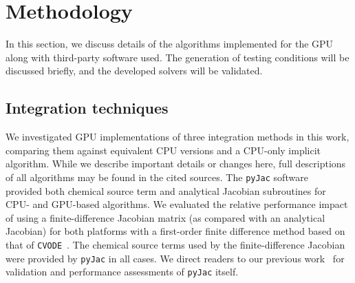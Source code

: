 \documentclass[preprint]{elsarticle}
\begin{document}
\section{Methodology}
\label{S:method}

In this section, we discuss details of the algorithms implemented for the GPU along with third-party software used.
The generation of testing conditions will be discussed briefly, and the developed solvers will be validated.

\subsection{Integration techniques}

We investigated GPU implementations of three integration methods in this work, comparing them against equivalent CPU versions and a CPU-only implicit algorithm.
While we describe important details or changes here, full descriptions of all algorithms may be found in the cited sources.
The \texttt{pyJac} software~\cite{niemeyer_2016_51139,Niemeyer:2015ws,Niemeyer:2016aa} provided both chemical source term and analytical Jacobian subroutines for CPU- and GPU-based algorithms.
We evaluated the relative performance impact of using a finite-difference Jacobian matrix (as compared with an analytical Jacobian) for both platforms with a first-order finite difference method based on that of \texttt{CVODE}~\cite{Hindmarsh:2005hg}.
The chemical source terms used by the finite-difference Jacobian were provided by \texttt{pyJac} in all cases.
We direct readers to our previous work~\cite{Niemeyer:2015ws,Niemeyer:2016aa} for validation and performance assessments of \texttt{pyJac} itself.
\end{document}
